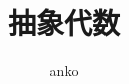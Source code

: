 \documentclass[a4paper,dvipdfmx]{jsarticle}
\theoremstyle{plain}
\theoremstyle{definition}
\theoremstyle{plain}
\numberwithin{equation}{section}
\numberwithin{theorem}{section}
\numberwithin{definition}{section}
\numberwithin{note}{section}
\theoremstyle{definition}
\begin{document}
\title{抽象代数}
\author{
  anko
}
\maketitle
\tableofcontents
\clearpage
\end{document}
